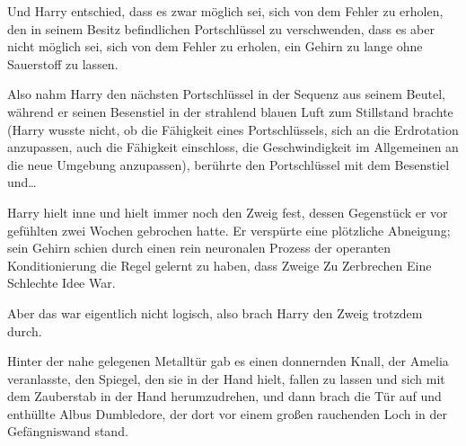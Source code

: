 Und Harry entschied, dass es zwar möglich sei, sich von dem Fehler zu erholen, den in seinem Besitz befindlichen Portschlüssel zu verschwenden, dass es aber nicht möglich sei, sich von dem Fehler zu erholen, ein Gehirn zu lange ohne Sauerstoff zu lassen.

Also nahm Harry den nächsten Portschlüssel in der Sequenz aus seinem Beutel, während er seinen Besenstiel in der strahlend blauen Luft zum Stillstand brachte (Harry wusste nicht, ob die Fähigkeit eines Portschlüssels, sich an die Erdrotation anzupassen, auch die Fähigkeit einschloss, die Geschwindigkeit im Allgemeinen an die neue Umgebung anzupassen), berührte den Portschlüssel mit dem Besenstiel und…

Harry hielt inne und hielt immer noch den Zweig fest, dessen Gegenstück er vor gefühlten zwei Wochen gebrochen hatte. Er verspürte eine plötzliche Abneigung; sein Gehirn schien durch einen rein neuronalen Prozess der operanten Konditionierung die Regel gelernt zu haben, dass Zweige Zu Zerbrechen Eine Schlechte Idee War.

Aber das war eigentlich nicht logisch, also brach Harry den Zweig trotzdem durch.

\later

Hinter der nahe gelegenen Metalltür gab es einen donnernden Knall, der Amelia veranlasste, den Spiegel, den sie in der Hand hielt, fallen zu lassen und sich mit dem Zauberstab in der Hand herumzudrehen, und dann brach die Tür auf und enthüllte Albus Dumbledore, der dort vor einem großen rauchenden Loch in der Gefängniswand stand.

